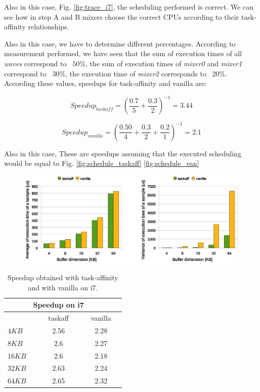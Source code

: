 Also in this case, Fig. \ref{fig:trace_i7}, the scheduling performed is correct. We can see how in step A and B mixers choose the correct CPUs according to
their task-affinity relationships.

Also in this case, we have to determine different percentages. According to measurement performed, we have seen that the sum of execution times of 
all \textit{waves} correspond to ~$50\%$, the sum of execution times of \textit{mixer0} and \textit{mixer1} correspond to ~$30\%$, the execution time 
of \textit{mixer2} corresponds to ~$20\%$. According these values, speedups for task-affinity and vanilla are:

\begin{equation}
  Speedup_{taskaff} = \left(\frac{0.7}{5} + \frac{0.3}{2} \right)^{-1} = 3.44
\label{eq:speedup_i7_taskaff}
\end{equation}

\begin{equation}
  Speedup_{vanilla} = \left(\frac{0.50}{4} + \frac{0.3}{2} + \frac{0.2}{1} \right)^{-1} = 2.1
\label{eq:speedup_i7_van}
\end{equation}

Also in this case, These are speedups assuming that the executed scheduling would be equal to Fig. \ref{fig:schedule_taskaff} \ref{fig:schedule_van}

\begin{figure}[htbp]
\centering
\includegraphics[width=\widefigure]{images/results_i7/time_avg_var_i7.eps}
\caption{}
\label{fig:time_avg_var_i7}
\end{figure}

\begin{table}[htbp]
\begin{center}
\begin{tabular}{l|c|c|c}
	\hline
	& Speedup on i7 \\ \hline
	& taskaff & vanilla \\ \hline
	$4KB$ & 2.56 & 2.28 \\ \hline
	$8KB$ & 2.6  & 2.27 \\ \hline
	$16KB$ & 2.6 & 2.18 \\ \hline
	$32KB$ & 2.63 & 2.24 \\ \hline
	$64KB$ & 2.65 & 2.32 \\ \hline
\end{tabular}
\caption{Speedup obtained with task-affinity and with vanilla on i7.}
\label{tab:speedup_i7}
\end{center}
\end{table}

